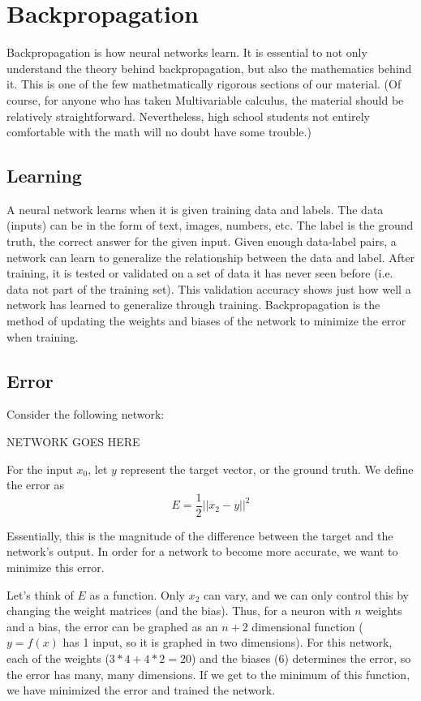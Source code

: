 \documentclass{article}
\begin{document}
\section{Backpropagation}
Backpropagation is how neural networks learn. It is essential to not only understand the theory behind backpropagation, but also the mathematics behind it. This is one of the few mathetmatically rigorous sections of our material. (Of course, for anyone who has taken Multivariable calculus, the material should be relatively straightforward. Nevertheless, high school students not entirely comfortable with the math will no doubt have some trouble.)
\subsection{Learning}
A neural network learns when it is given training data and labels. The data (inputs) can be in the form of text, images, numbers, etc. The label is the ground truth, the correct answer for the given input. Given enough data-label pairs, a network can learn to generalize the relationship between the data and label. After training, it is tested or validated on a set of data it has never seen before (i.e. data not part of the training set). This validation accuracy shows just how well a network has learned to generalize through training. Backpropagation is the method of updating the weights and biases of the network to minimize the error when training.
\subsection{Error}
Consider the following network:

NETWORK GOES HERE

For the input $x_0$, let $y$ represent the target vector, or the ground truth. We define the error as
\[E = \frac{1}{2}||x_2-y||^2\]

Essentially, this is the magnitude of the difference between the target and the network's output. In order for a network to become more accurate, we want to minimize this error.

Let's think of $E$ as a function. Only $x_2$ can vary, and we can only control this by changing the weight matrices (and the bias). Thus, for a neuron with $n$ weights and a bias, the error can be graphed as an $n+2$ dimensional function ($y = f(x)$ has 1 input, so it is graphed in two dimensions). For this network, each of the weights ($3*4 + 4*2 = 20$) and the biases ($6$) determines the error, so the error has many, many dimensions. If we get to the minimum of this function, we have minimized the error and trained the network.
\end{document}
